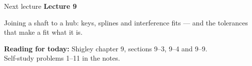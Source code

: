 \documentclass[aspectratio=169,10pt]{beamer}
\begin{document}
\begin{frame}{Next lecture}
\textbf{Lecture 9}

\medskip
Joining a shaft to a hub: keys, splines and interference fits --- and the tolerances that make a
fit what it is.

\vfill
\textbf{Reading for today:} Shigley chapter 9, sections 9--3, 9--4 and 9--9.\\
Self-study problems 1--11 in the notes.
\end{frame}
\end{document}
